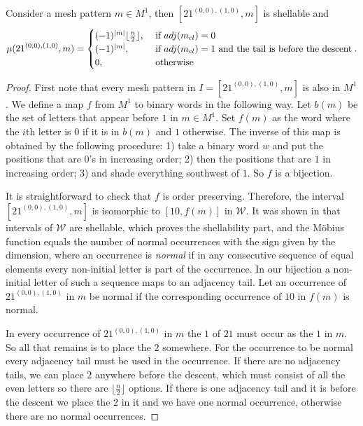 \documentclass[11pt,a4paper,oneside]{article}
\begin{document}
\begin{lem}\label{lem:mobUn}
Consider a mesh pattern $m\in M^1$, then $[21^{(0,0),(1,0)},m]$ is shellable and
\[
\mu(21^{(0,0),(1,0)},m)=\begin{cases}
(-1)^{|m|}\lfloor\frac{n}{2}\rfloor,&\text{ if } adj(m_{cl})=0\\
(-1)^{|m|},& \text{ if } adj(m_{cl})=1 \text{ and the tail is before the descent}\\
0, &\text{ otherwise}
\end{cases}.
\]
\begin{proof}
First note that every mesh pattern in $I=[21^{(0,0),(1,0)},m]$ is also in $M^1$.
We define a map $f$ from $M^1$ to binary words in the following way. Let $b(m)$ be the
set of letters that appear before $1$ in $m\in M^1$. Set $f(m)$ as the word where
the $i$th letter is $0$ if it is in $b(m)$ and $1$ otherwise. The inverse of this map
is obtained by the following procedure: 1) take a binary word $w$ and put the positions that are $0$'s in increasing order; 2)
then the positions that are $1$ in increasing order; 3) and shade everything southwest of $1$. 
So $f$ is a bijection.

It is straightforward
to check that $f$ is order preserving. Therefore,
the interval $[21^{(0,0),(1,0)},m]$ is isomorphic to $[10,f(m)]$ in $\mathcal{W}$.
It was shown in
\cite{Bjo90} that intervals of $\mathcal{W}$
are shellable, which proves the shellability part, and the M\"obius
function equals the number of normal
occurrences with the sign given by the dimension,
where an occurrence is \emph{normal} if in any consecutive sequence
of equal elements every
non-initial letter is part of the occurrence. In our bijection a non-initial letter 
of such a sequence maps to an adjacency tail. Let an occurrence of $21^{(0,0),(1,0)}$ in $m$
be normal if the corresponding occurrence of $10$ in $f(m)$ is normal.

In every occurrence of
$21^{(0,0),(1,0)}$ in $m$ the $1$ of $21$ must occur as the $1$ in $m$. So
all that remains is to place the $2$ somewhere. For the occurrence to be normal
every adjacency tail must be used in the occurrence. If there are no adjacency tails,
we can place $2$ anywhere before the descent, which must consist of all the even
letters so there are $\lfloor\frac{n}{2}\rfloor$ options. If there is one adjacency tail and
it is before the descent we place the $2$ in it and we have one normal occurrence,
otherwise there are no normal occurrences.
\end{proof}
\end{lem}
\end{document}
